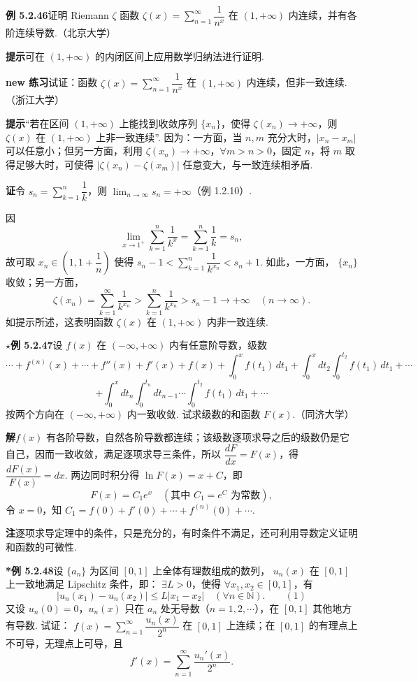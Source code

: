 \documentclass[UTF8, 12pt, fontset=fandol, oneside]{ctexart}
\begin{document}
\noindent\textbf{例 5.2.46}\quad 证明 Riemann $\zeta$ 函数
$\zeta(x)=\displaystyle\sum_{n=1}^{\infty}\dfrac1{n^x}$ 在
$(1,+\infty)$ 内连续，并有各阶连续导数.（北京大学）

\noindent\textbf{提示}\quad 可在 $(1,+\infty)$ 的内闭区间上应用数学归纳法进行证明.

\noindent\textbf{new 练习}\quad 试证：函数
$\zeta(x)=\displaystyle\sum_{n=1}^{\infty}\dfrac1{n^x}$ 在
$(1,+\infty)$ 内连续，但非一致连续.（浙江大学）

\noindent\textbf{提示}\quad “若在区间 $(1,+\infty)$ 上能找到收敛序列 $\{x_n\}$，使得
$\zeta(x_n)\to+\infty$，则 $\zeta(x)$ 在 $(1,+\infty)$ 上非一致连续”. 因为：一方面，当
$n,m$ 充分大时，$|x_n-x_m|$ 可以任意小；但另一方面，利用
$\zeta(x_n)\to+\infty$，$\forall m>n>0$，固定 $n$，将 $m$ 取得足够大时，可使得
$|\zeta(x_n)-\zeta(x_m)|$ 任意变大，与一致连续相矛盾.

\noindent\textbf{证}\quad 令 $s_n=\displaystyle\sum_{k=1}^{n}\dfrac1k$，则
$\displaystyle\lim_{n\to\infty}s_n=+\infty$（例 1.2.10）.

因
\[
  \lim_{x\to1^+}\sum_{k=1}^{n}\frac1{k^x}
  =\sum_{k=1}^{n}\frac1k=s_n,
\]
故可取 $x_n\in\left(1,1+\dfrac1n\right)$ 使得
$s_n-1<\displaystyle\sum_{k=1}^{n}\dfrac1{k^{x_n}}<s_n+1$. 如此，一方面，
$\{x_n\}$ 收敛；另一方面，
\[
  \zeta(x_n)=\sum_{k=1}^{\infty}\frac1{k^{x_n}}
  >\sum_{k=1}^{n}\frac1{k^{x_n}}>s_n-1\to+\infty\quad(n\to\infty).
\]
如提示所述，这表明函数 $\zeta(x)$ 在 $(1,+\infty)$ 内非一致连续.

\noindent\textbf{$\star$例 5.2.47}\quad 设 $f(x)$ 在 $(-\infty,+\infty)$ 内有任意阶导数，级数
\[
\cdots+f^{(n)}(x)+\cdots+f''(x)+f'(x)+f(x)
+\int_0^x f(t_1)\,dt_1
+\int_0^xdt_2\int_0^{t_2}f(t_1)\,dt_1+\cdots
\]
\[
  +\int_0^xdt_n\int_0^{t_n}dt_{n-1}\cdots\int_0^{t_2}f(t_1)\,dt_1+\cdots
\]
按两个方向在 $(-\infty,+\infty)$ 内一致收敛. 试求级数的和函数 $F(x)$.（同济大学）

\noindent\textbf{解}\quad $f(x)$ 有各阶导数，自然各阶导数都连续；该级数逐项求导之后的级数仍是它自己，因而一致收敛，满足逐项求导三条件，所以
$\dfrac{dF}{dx}=F(x)$，得 $\dfrac{dF(x)}{F(x)}=dx$. 两边同时积分得
$\ln F(x)=x+C$，即
\[
  F(x)=C_1e^x\quad(\text{其中 }C_1=e^C\text{ 为常数}),
\]
令 $x=0$，知 $C_1=f(0)+f'(0)+\cdots+f^{(n)}(0)+\cdots$.

\noindent\textbf{注}\quad 逐项求导定理中的条件，只是充分的，有时条件不满足，还可利用导数定义证明和函数的可微性.

\noindent\textbf{*例 5.2.48}\quad 设 $\{a_n\}$ 为区间 $[0,1]$ 上全体有理数组成的数列，
$u_n(x)$ 在 $[0,1]$ 上一致地满足 Lipschitz 条件，即：
$\exists L>0$，使得 $\forall x_1,x_2\in[0,1]$，有
\[
  |u_n(x_1)-u_n(x_2)|\le L|x_1-x_2|\quad(\forall n\in\mathbb N).
\qquad(1)
\]
又设 $u_n(0)=0$，$u_n(x)$ 只在 $a_n$ 处无导数（$n=1,2,\cdots$），在
$[0,1]$ 其他地方有导数. 试证：
$f(x)=\displaystyle\sum_{n=1}^{\infty}\dfrac{u_n(x)}{2^n}$ 在
$[0,1]$ 上连续；在 $[0,1]$ 的有理点上不可导，无理点上可导，且
\[
  f'(x)=\sum_{n=1}^{\infty}\frac{u_n'(x)}{2^n}.
\]
\end{document}
